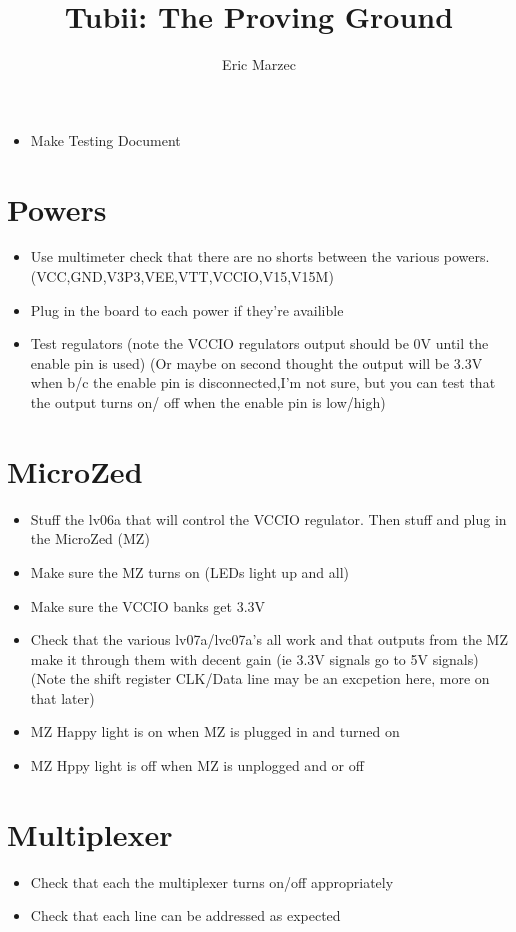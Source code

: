 \documentclass[11pt,a4paper]{article}
\title{Tubii: The Proving Ground}
\author{Eric Marzec}
\begin{document}
\maketitle
\begin{abstract}

\end{abstract}
\begin{itemize}
\item Make Testing Document
\end{itemize}
\section{Powers}
\begin{itemize}
\item Use multimeter check that there are no shorts between the various powers.
(VCC,GND,V3P3,VEE,VTT,VCCIO,V15,V15M)
\item Plug in the board to each power if they're availible
\item Test regulators (note the VCCIO regulators output should be 0V until the 
enable pin is used) (Or maybe on second thought the output will be 3.3V when b/c the
enable pin is disconnected,I'm not sure, but you can test that the output turns on/ off when the enable pin is low/high)
\end{itemize}
\section{MicroZed}
\begin{itemize}
\item Stuff the lv06a that will control the VCCIO regulator. Then stuff and plug in the MicroZed (MZ)
\item Make sure the MZ turns on (LEDs light up and all)
\item Make sure the VCCIO banks get 3.3V
\item Check that the various lv07a/lvc07a's all work and that outputs from the MZ
make it through them with decent gain (ie 3.3V signals go to 5V signals)(Note the shift register CLK/Data line may be an excpetion here, more on that later)
\item MZ Happy light is on when MZ is plugged in and turned on
\item MZ Hppy light is off when MZ is unplogged and or off
\end{itemize}
\section{Multiplexer}
\begin{itemize}
\item Check that each the multiplexer turns on/off appropriately
\item Check that each line can be addressed as expected
\end{itemize}
\end{document}
